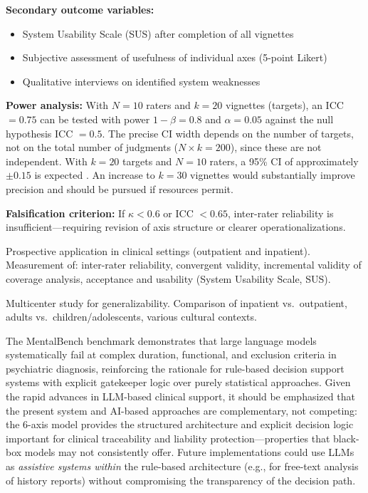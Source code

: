 \documentclass[11pt,a4paper]{article}
\begin{document}
\begin{description}[style=nextline, leftmargin=1.5cm, font=\bfseries]
\textbf{Secondary outcome variables:}
\begin{itemize}[leftmargin=*, noitemsep]
    \item System Usability Scale (SUS) after completion of all vignettes
    \item Subjective assessment of usefulness of individual axes (5-point Likert)
    \item Qualitative interviews on identified system weaknesses
\end{itemize}

\textbf{Power analysis:} With $N = 10$ raters and $k = 20$ vignettes (targets), an ICC $= 0.75$ can be tested with power $1 - \beta = 0.8$ and $\alpha = 0.05$ against the null hypothesis ICC $= 0.5$. The precise CI width depends on the number of targets, not on the total number of judgments ($N \times k = 200$), since these are not independent. With $k = 20$ targets and $N = 10$ raters, a 95\% CI of approximately $\pm 0.15$ is expected \citep{Shrout1979}. An increase to $k = 30$ vignettes would substantially improve precision and should be pursued if resources permit.

\textbf{Falsification criterion:} If $\kappa < 0.6$ or ICC $< 0.65$, inter-rater reliability is insufficient---requiring revision of axis structure or clearer operationalizations.

\item[Phase~3: Clinical Field Trial (N=200+)] Prospective application in clinical settings (outpatient and inpatient). Measurement of: inter-rater reliability, convergent validity, incremental validity of coverage analysis, acceptance and usability (System Usability Scale, SUS).
\item[Phase~4: Multi-Site Trial] Multicenter study for generalizability. Comparison of inpatient vs.\ outpatient, adults vs.\ children/adolescents, various cultural contexts.
\end{description}

The MentalBench benchmark \citep{Song2026MentalBench} demonstrates that large language models systematically fail at complex duration, functional, and exclusion criteria in psychiatric diagnosis, reinforcing the rationale for rule-based decision support systems with explicit gatekeeper logic over purely statistical approaches. Given the rapid advances in LLM-based clinical support, it should be emphasized that the present system and AI-based approaches are complementary, not competing: the 6-axis model provides the structured architecture and explicit decision logic important for clinical traceability and liability protection---properties that black-box models may not consistently offer. Future implementations could use LLMs as \textit{assistive systems within} the rule-based architecture (e.g., for free-text analysis of history reports) without compromising the transparency of the decision path.
\end{document}
